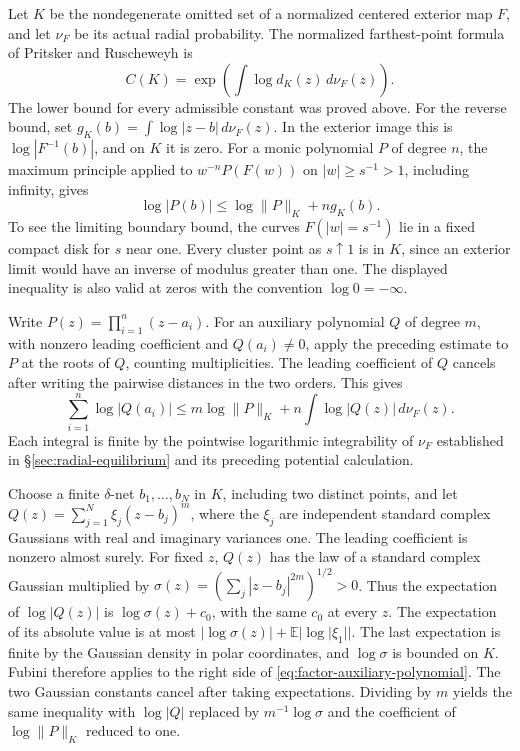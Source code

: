 \documentclass[11pt]{article}
\begin{document}
	Let $K$ be the nondegenerate omitted set of a normalized centered
	exterior map $F$, and let $\nu_F$ be its actual radial probability.
	The normalized farthest-point formula of Pritsker and Ruscheweyh
	\cite[Theorem~1.1]{PR2} is
	\begin{equation}\label{eq:actual-factor-formula}
		C(K)=\exp\left(\int\log d_K(z)\,d\nu_F(z)\right).
	\end{equation}
	The lower bound for every admissible constant was proved above.
	For the reverse bound, set
	$g_K(b)=\int\log|z-b|\,d\nu_F(z)$. In the exterior image this is
	$\log |F^{-1}(b)|$, and on $K$ it is zero. For a monic polynomial $P$
	of degree $n$, the maximum principle applied to
	$w^{-n}P(F(w))$ on $|w|\ge s^{-1}>1$, including infinity, gives
	\[
	\log|P(b)|\le\log\|P\|_K+n g_K(b).
	\]
	To see the limiting boundary bound, the curves $F(|w|=s^{-1})$ lie in
	a fixed compact disk for $s$ near one. Every cluster point as
	$s\uparrow1$ is in $K$, since an exterior limit would have an inverse
	of modulus greater than one. The displayed inequality is also valid
	at zeros with the convention $\log0=-\infty$.
	
	Write $P(z)=\prod_{i=1}^n(z-a_i)$. For an auxiliary polynomial $Q$
	of degree $m$, with nonzero leading coefficient and $Q(a_i)\ne0$,
	apply the preceding estimate to $P$ at the roots of $Q$, counting
	multiplicities. The leading coefficient of $Q$ cancels after writing
	the pairwise distances in the two orders. This gives
	\begin{equation}\label{eq:factor-auxiliary-polynomial}
		\sum_{i=1}^n\log|Q(a_i)|\le m\log\|P\|_K
		+n\int\log|Q(z)|\,d\nu_F(z).
	\end{equation}
	Each integral is finite by the pointwise logarithmic integrability of
	$\nu_F$ established in \S\ref{sec:radial-equilibrium} and its
	preceding potential calculation.
	
	Choose a finite $\delta$-net $b_1,\ldots,b_N$ in $K$, including two
	distinct points, and let $Q(z)=\sum_{j=1}^N\xi_j(z-b_j)^m$, where
	the $\xi_j$ are independent standard complex Gaussians with real and
	imaginary variances one. The leading coefficient is nonzero almost
	surely. For fixed $z$, $Q(z)$ has the law of a standard complex
	Gaussian multiplied by
	$\sigma(z)=(\sum_j |z-b_j|^{2m})^{1/2}>0$. Thus the expectation of
	$\log|Q(z)|$ is $\log\sigma(z)+c_0$, with the same $c_0$ at every $z$.
	The expectation of its absolute value is at most
	$|\log\sigma(z)|+\mathbb E|\log|\xi_1||$. The last expectation is
	finite by the Gaussian density in polar coordinates, and
	$\log\sigma$ is bounded on $K$. Fubini therefore applies to the
	right side of \eqref{eq:factor-auxiliary-polynomial}. The two Gaussian
	constants cancel after taking expectations. Dividing by $m$ yields
	the same inequality with $\log|Q|$ replaced by
	$m^{-1}\log\sigma$ and the coefficient of $\log\|P\|_K$ reduced to one.
	
\end{document}
